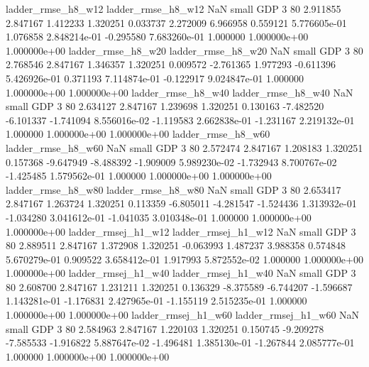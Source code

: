       ladder_rmse_h8_w12       ladder_rmse_h8_w12                   NaN      small      GDP                 3 80 2.911855       2.847167 1.412233       1.320251    0.033737      2.272009      6.966958     0.559121   5.776605e-01  1.076858 2.848214e-01    -0.295580   7.683260e-01            1.000000    1.000000e+00        1.000000e+00
      ladder_rmse_h8_w20       ladder_rmse_h8_w20                   NaN      small      GDP                 3 80 2.768546       2.847167 1.346357       1.320251    0.009572     -2.761365      1.977293    -0.611396   5.426926e-01  0.371193 7.114874e-01    -0.122917   9.024847e-01            1.000000    1.000000e+00        1.000000e+00
      ladder_rmse_h8_w40       ladder_rmse_h8_w40                   NaN      small      GDP                 3 80 2.634127       2.847167 1.239698       1.320251    0.130163     -7.482520     -6.101337    -1.741094   8.556016e-02 -1.119583 2.662838e-01    -1.231167   2.219132e-01            1.000000    1.000000e+00        1.000000e+00
      ladder_rmse_h8_w60       ladder_rmse_h8_w60                   NaN      small      GDP                 3 80 2.572474       2.847167 1.208183       1.320251    0.157368     -9.647949     -8.488392    -1.909009   5.989230e-02 -1.732943 8.700767e-02    -1.425485   1.579562e-01            1.000000    1.000000e+00        1.000000e+00
      ladder_rmse_h8_w80       ladder_rmse_h8_w80                   NaN      small      GDP                 3 80 2.653417       2.847167 1.263724       1.320251    0.113359     -6.805011     -4.281547    -1.524436   1.313932e-01 -1.034280 3.041612e-01    -1.041035   3.010348e-01            1.000000    1.000000e+00        1.000000e+00
     ladder_rmsej_h1_w12      ladder_rmsej_h1_w12                   NaN      small      GDP                 3 80 2.889511       2.847167 1.372908       1.320251   -0.063993      1.487237      3.988358     0.574848   5.670279e-01  0.909522 3.658412e-01     1.917993   5.872552e-02            1.000000    1.000000e+00        1.000000e+00
     ladder_rmsej_h1_w40      ladder_rmsej_h1_w40                   NaN      small      GDP                 3 80 2.608700       2.847167 1.231211       1.320251    0.136329     -8.375589     -6.744207    -1.596687   1.143281e-01 -1.176831 2.427965e-01    -1.155119   2.515235e-01            1.000000    1.000000e+00        1.000000e+00
     ladder_rmsej_h1_w60      ladder_rmsej_h1_w60                   NaN      small      GDP                 3 80 2.584963       2.847167 1.220103       1.320251    0.150745     -9.209278     -7.585533    -1.916822   5.887647e-02 -1.496481 1.385130e-01    -1.267844   2.085777e-01            1.000000    1.000000e+00        1.000000e+00
